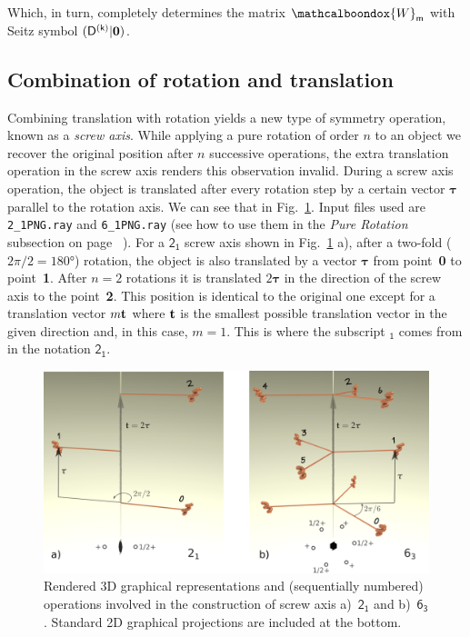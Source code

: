 \vspace{0.2cm}
Which, in turn, completely determines the matrix $\mathcalboondox{W}_\mathsf{m}$ with Seitz symbol  $(\mathsf{D^{(k)}} |\vb{0})$.



\subsection{Combination of rotation and translation}
\label{sec:screw}
Combining translation with rotation yields a new type of symmetry operation, known as a \textit{screw axis}. While applying a pure rotation of order $n$ to an object we recover the original position after $n$ successive operations, the extra translation operation in the screw axis renders this observation invalid. During a screw axis operation, the object is translated after every rotation step by a certain vector $\boldsymbol{\tau}$ parallel to the rotation axis. We can see that in Fig.~\ref{Fig:ScrewRotation}. Input files used are \texttt{2\_1PNG.ray} and \texttt{6\_1PNG.ray}  (see how to use them in the \textit{Pure Rotation} subsection on page~\pageref{Fig:pureRotation} ).  For a $\mathsf{2_1}$ screw axis shown in Fig.~\ref{Fig:ScrewRotation} a), after a two-fold ($2\pi/2=180\si{\degree}$) rotation, the object is also translated by a vector $\boldsymbol{\tau}$ from point~\textbf{0} to point~\textbf{1}. After $n=2$ rotations it is translated $2 \boldsymbol{\tau}$ in the direction of the screw axis to the point~\textbf{2}. This position is identical to the original one except for a translation vector $m \vb{t}$ where $\vb{t}$ is the smallest possible translation vector in the given direction and, in this case, $m=1$. This is where the subscript $_\mathsf{1}$ comes from in the notation $\mathsf{2_1}$.


\begin{figure}[ht]
    \centering
\includegraphics[width=1.\linewidth]{Figures/screwRotation.png}
\caption{Rendered 3D graphical representations and (sequentially numbered) operations involved in the construction of screw axis a)~$\mathsf{2_1}$ and b)~$\mathsf{6_3}$. Standard 2D graphical projections are included at the bottom. }
\label{Fig:ScrewRotation}
\end{figure}

